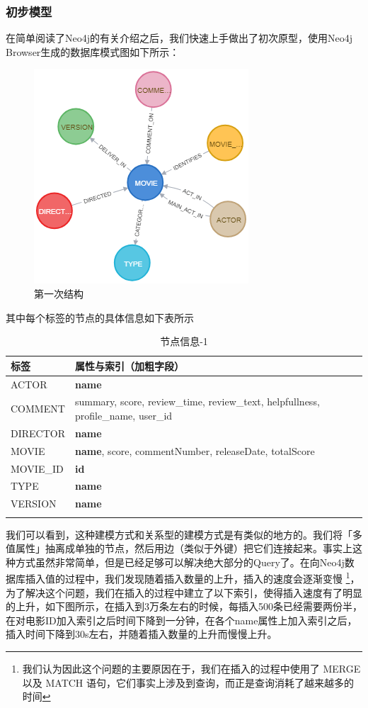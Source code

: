 \documentclass{ctexrep}
\begin{document}
	\subsubsection{初步模型} \label{neo:1}
	在简单阅读了Neo4j的有关介绍之后，我们快速上手做出了初次原型，使用Neo4j Browser生成的数据库模式图如下所示：
\begin{figure}[H]
	\centering
	\includegraphics[width=0.7\linewidth]{img/graph1}
	\caption{第一次结构}
	\label{fig:graph1}
\end{figure}
	其中每个标签的节点的具体信息如下表所示\begin{longtable}{l|p{8cm}}
		\hline
		标签 & 属性与索引（加粗字段） \\
		\hline
		\hline
		ACTOR & \textbf{name} \\
		COMMENT & summary, score, review\_time, review\_text, helpfullness, profile\_name, user\_id \\
		DIRECTOR & \textbf{name}\\
		MOVIE & \textbf{name}, score, commentNumber, releaseDate, totalScore \\
		MOVIE\_ID & \textbf{id} \\
		TYPE & \textbf{name}\\
		VERSION & \textbf{name}\\
		\hline
		\caption{节点信息-1}
	\end{longtable}
	我们可以看到，这种建模方式和关系型的建模方式是有类似的地方的。我们将「多值属性」抽离成单独的节点，然后用边（类似于外键）把它们连接起来。事实上这种方式虽然非常简单，但是已经足够可以解决绝大部分的Query了。在向Neo4j数据库插入值的过程中，我们发现随着插入数量的上升，插入的速度会逐渐变慢 \footnote{我们认为因此这个问题的主要原因在于，我们在插入的过程中使用了 MERGE 以及 MATCH 语句，它们事实上涉及到查询，而正是查询消耗了越来越多的时间}，为了解决这个问题，我们在插入的过程中建立了以下索引，使得插入速度有了明显的上升，如下图所示，在插入到3万条左右的时候，每插入500条已经需要两份半，在对电影ID加入索引之后时间下降到一分钟，在各个name属性上加入索引之后，插入时间下降到30s左右，并随着插入数量的上升而慢慢上升。
\end{document}
